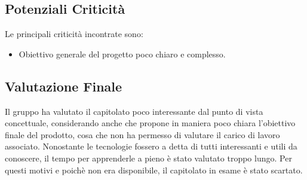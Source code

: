 \subsection{Potenziali Criticità}
	Le principali criticità incontrate sono:
	\begin{itemize}
		\item Obiettivo generale del progetto poco chiaro e complesso.
	\end{itemize}

\subsection{Valutazione Finale}
	Il gruppo ha valutato il capitolato poco interessante dal punto di vista concettuale, considerando anche che propone in maniera poco chiara l'obiettivo finale del prodotto, cosa che non ha permesso di valutare il carico di lavoro associato. Nonostante le tecnologie fossero a detta di tutti interessanti e utili da conoscere, il tempo per apprenderle a pieno è stato valutato troppo lungo. Per questi motivi e poichè non era disponibile, il capitolato in esame è stato scartato.
